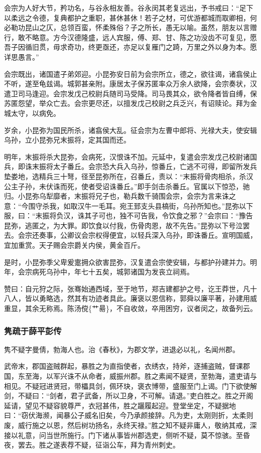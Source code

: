 \documentclass[]{article}
\begin{document}
会宗为人好大节，矜功名，与谷永相友善。谷永闵其老复远出，予书戒曰：``足下以柔远之令德，复典都护之重职，甚休甚休！若子之材，可优游都城而取卿相，何必勒功昆山之仄，总领百蛮，怀柔殊俗？子之所长，愚无以喻。虽然，朋友以言赠行，敢不略意。方今汉德隆盛，远人宾服，傅、郑、甘、陈之功没齿不可复见，愿吾子因循旧贯，毋求奇功，终更亟还，亦足以复雁门之踦，万里之外以身为本。愿详思愚言。''

会宗既出，诸国遣子弟郊迎。小昆弥安日前为会宗所立，德之，欲往谒，诸翕侯止不听，遂至龟兹谒。城郭甚亲附。康居太子保苏匿率众万余人欲降，会宗奏状，汉遣卫司马逢迎。会宗发戊己校尉兵随司马受降。司马畏其众，欲令降者皆自缚，保苏匿怨望，举众亡去。会宗更尽还，以擅发戊己校尉之兵乏兴，有诏赎论。拜为金城太守，以病免。

岁余，小昆弥为国民所杀，诸翕侯大乱。征会宗为左曹中郎将、光禄大夫，使安辑乌孙，立小昆弥兄末振将，定其国而还。

明年，末振将杀大昆弥，会病死，汉恨诛不加。元延中，复遣会宗发戊己校尉诸国兵，即诛末振将太子番丘。会宗恐大兵入乌孙，惊番丘，亡逃不可得，即留所发兵垫娄地，选精兵三十弩，径至昆弥所在，召番丘，责以：``末振将骨肉相杀，杀汉公主子孙，未伏诛而死，使者受诏诛番丘。''即手剑击杀番丘。官属以下惊恐，驰归。小昆弥乌犁靡者，末振将兄子也，勒兵数千骑围会宗，会宗为言来诛之意：``今围守杀我，如取汉牛一毛耳。宛王郅支头县槁街，乌孙所知也。''昆弥以下服，曰：``末振将负汉，诛其子可也，独不可告我，令饮食之邪？''会宗曰：``豫告昆弥，逃匿之，为大罪。即饮食以付我，伤骨肉恩，故不先告。''昆弥以下号泣罢去。会宗还奏事，公卿议会宗权得便宜，以轻兵深入乌孙，即诛番丘。宣明国威，宜加重赏。天子赐会宗爵关内侯，黄金百斤。

是时，小昆弥季父卑爰疐拥众欲害昆弥，汉复遣会宗使安辑，与都护孙建并力。明年，会宗病死乌孙中，年七十五矣，城郭诸国为发丧立祠焉。

赞曰：自元狩之际，张骞始通西域，至于地节，郑吉建都护之号，讫王莽世，凡十八人，皆以勇略选，然其有功迹者具此。廉褒以恩信称，郭舜以廉平著，孙建用威重显，其余无称焉。陈汤傥\{艹昜\}，不自收敛，卒用困穷，议者闵之，故备列云。

\hypertarget{header-n5172}{%
\subsubsection{隽疏于薛平彭传}\label{header-n5172}}

隽不疑字曼倩，勃海人也。治《春秋》，为郡文学，进退必以礼，名闻州郡。

武帝末，郡国盗贼群起，暴胜之为直指使者，衣绣衣，持斧，逐捕盗贼，督课郡国，东至海，以军兴诛不从命者，威振州郡。胜之素闻不疑贤，至勃海，遣吏请与相见。不疑冠进贤冠，带櫑具剑，佩环玦，褒衣博带，盛服至门上谒。门下欲使解剑，不疑曰：``剑者，君子武备，所以卫身，不可解。请退。''吏白胜之。胜之开阁延请，望见不疑容貌尊严，衣冠甚伟，胜之躧履起迎。登堂坐定，不疑据地曰：``窃伏海濒，闻暴公子威名旧矣，今乃承颜接辞。凡为吏，太刚则折，太柔则废，威行施之以恩，然后树功扬名，永终天禄。''胜之知不疑非庸人，敬纳其戒，深接以礼意，问当世所施行。门下诸从事皆州郡选吏，侧听不疑，莫不惊骇。至昏夜，罢去。胜之遂表荐不疑，征诣公车，拜为青州刺史。
\end{document}
